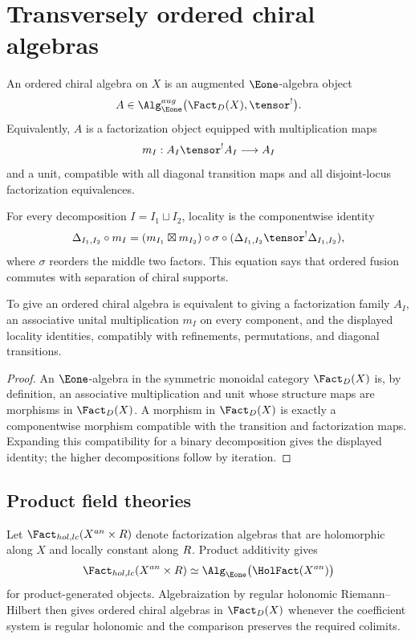 \chapter{Transversely ordered chiral algebras}
\begin{definition}
An ordered chiral algebra on $X$ is an augmented $\Eone$-algebra object
\[
 A\in \Alg_{\Eone}^{\mathrm{aug}}\bigl(\Fact_D(X),\tensor^!\bigr).
\]
Equivalently, $A$ is a factorization object equipped with multiplication maps
\[
 m_I:A_I\tensor^!A_I\longrightarrow A_I
\]
and a unit, compatible with all diagonal transition maps and all disjoint-locus factorization equivalences.
\end{definition}

For every decomposition $I=I_1\sqcup I_2$, locality is the componentwise identity
\[
 \Delta_{I_1,I_2}\circ m_I
 = (m_{I_1}\boxtimes m_{I_2})\circ\sigma\circ
   (\Delta_{I_1,I_2}\tensor^!\Delta_{I_1,I_2}),
\]
where $\sigma$ reorders the middle two factors. This equation says that ordered fusion commutes with separation of chiral supports.

\begin{theorem}
To give an ordered chiral algebra is equivalent to giving a factorization family $A_I$, an associative unital multiplication $m_I$ on every component, and the displayed locality identities, compatibly with refinements, permutations, and diagonal transitions.
\end{theorem}
\begin{proof}
An $\Eone$-algebra in the symmetric monoidal category $\Fact_D(X)$ is, by definition, an associative multiplication and unit whose structure maps are morphisms in $\Fact_D(X)$. A morphism in $\Fact_D(X)$ is exactly a componentwise morphism compatible with the transition and factorization maps. Expanding this compatibility for a binary decomposition gives the displayed identity; the higher decompositions follow by iteration.
\end{proof}

\section{Product field theories}
Let $\Fact_{\mathrm{hol,lc}}(X^{\mathrm{an}}\times\R)$ denote factorization algebras that are holomorphic along $X$ and locally constant along $R$. Product additivity gives
\[
 \Fact_{\mathrm{hol,lc}}(X^{\mathrm{an}}\times\R)
 \simeq
 \Alg_{\Eone}\bigl(\HolFact(X^{\mathrm{an}})\bigr)
\]
for product-generated objects. Algebraization by regular holonomic Riemann--Hilbert then gives ordered chiral algebras in $\Fact_D(X)$ whenever the coefficient system is regular holonomic and the comparison preserves the required colimits.

